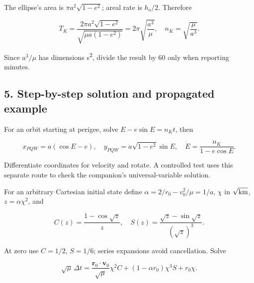 \documentclass[10pt,a4paper]{article}
\numberwithin{equation}{section}
\begin{document}
\begin{sloppypar}The ellipse's area is \(\pi a^2\sqrt{1-e^2}\); areal rate is \(h_o/2\). Therefore\end{sloppypar}


\begin{equation}T_K=\frac{2\pi a^2\sqrt{1-e^2}}{\sqrt{\mu a(1-e^2)}}
=2\pi\sqrt{\frac{a^3}{\mu}},\quad n_K=\sqrt{\frac{\mu}{a^3}}.\label{eq:kepler-period}\end{equation}

\begin{sloppypar}Since \(a^3/\mu\) has dimensions s\textsuperscript{2}, divide the result by 60 only when reporting minutes.\end{sloppypar}


\subsection*{5. Step-by-step solution and propagated example}

\begin{sloppypar}For an orbit starting at perigee, solve \(E-e\sin E=n_Kt\), then\end{sloppypar}


\begin{equation}x_{PQW}=a(\cos E-e),\quad y_{PQW}=a\sqrt{1-e^2}\sin E,\quad
\dot E=\frac{n_K}{1-e\cos E}.\label{eq:ch2-7}\end{equation}

\begin{sloppypar}Differentiate coordinates for velocity and rotate. A controlled test uses this separate route to check the companion's universal-variable solution.\end{sloppypar}


\begin{sloppypar}For an arbitrary Cartesian initial state define \(\alpha=2/r_0-v_0^2/\mu=1/a\), \(\chi\) in \(\sqrt{\rm km}\), \(z=\alpha\chi^2\), and\end{sloppypar}


\begin{equation}C(z)=\frac{1-\cos\sqrt z}{z},\quad
S(z)=\frac{\sqrt z-\sin\sqrt z}{(\sqrt z)^3}.\label{eq:ch2-8}\end{equation}

\begin{sloppypar}At zero use \(C=1/2\), \(S=1/6\); series expansions avoid cancellation. Solve\end{sloppypar}


\begin{equation}\sqrt\mu\,\Delta t=
\frac{\mathbf r_0\cdot\mathbf v_0}{\sqrt\mu}\chi^2C
+(1-\alpha r_0)\chi^3S+r_0\chi.\label{eq:ch2-9}\end{equation}
\end{document}
